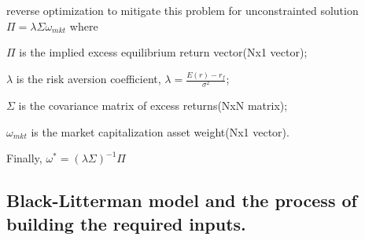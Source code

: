 \documentclass[presentation]{beamer}
\begin{document}
\begin{frame}[label={sec:orgheadline22}]{reverse optimization to mitigate this problem for unconstrainted solution}
\(\Pi = \lambda\Sigma\omega_{mkt}\)
where

\(\Pi\) is the implied excess equilibrium return vector(Nx1 vector);

\(\lambda\) is the risk aversion coefficient, \(\lambda=\frac{E(r)-r_f}{\sigma^2}\);

\(\Sigma\) is the covariance matrix of excess returns(NxN matrix);

\(\omega_{mkt}\) is the market capitalization asset weight(Nx1 vector).

Finally,
\(\omega^* = (\lambda\Sigma)^{-1}\Pi\)
\end{frame}
\subsection{Black-Litterman model and the process of building the required inputs.}
\label{sec:orgheadline27}
\end{document}
